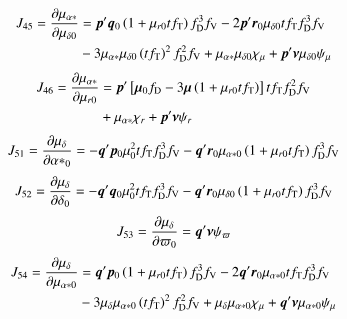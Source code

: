 \documentclass{aa}
\def\vec#1{\ensuremath{\mathchoice{\mbox{\boldmath$\displaystyle#1$}}
{\mbox{\boldmath$\textstyle#1$}}
{\mbox{\boldmath$\scriptstyle#1$}}
{\mbox{\boldmath$\scriptscriptstyle#1$}}}}
\begin{document}
\begin{equation*}
 \begin{aligned}
    J_{45}=\frac{\partial\mu_{\alpha*}}{\partial\mu_{\delta0}} &=
    \vec{p}'\vec{q}_0\left(1+\mu_{r0}tf_\mathrm{T}\right)f_\mathrm{D}^3f_\mathrm{V}
    -2\vec{p}'\vec{r}_0\mu_{\delta0}tf_\mathrm{T}f_\mathrm{D}^3f_\mathrm{V}\\
    &-3\mu_{\alpha*}\mu_{\delta0}\left(tf_\mathrm{T}\right)^2f_\mathrm{D}^2f_\mathrm{V}
    +\mu_{\alpha*}\mu_{\delta0}\chi_\mu
    +\vec{p}'\vec{\nu}\mu_{\delta0}\psi_\mu
 \end{aligned}
\end{equation*}
\begin{equation*}
 \begin{aligned}
    J_{46}=\frac{\partial\mu_{\alpha*}}{\partial\mu_{r0}}&=
    \vec{p}'\left[\vec{\mu}_0f_\mathrm{D}-3\vec{\mu}\left(1+\mu_{r0}tf_\mathrm{T}\right)\right]
    tf_\mathrm{T}f_\mathrm{D}^2f_\mathrm{V}\\
    &+\mu_{\alpha*}\chi_r+\vec{p}'\vec{\nu}\psi_r
 \end{aligned}
\end{equation*}
\begin{equation*}
 \begin{aligned}
    J_{51}=\frac{\partial\mu_\delta}{\partial{\alpha*}_0}=
    -\vec{q}'\vec{p}_0\mu_0^2tf_\mathrm{T}f_\mathrm{D}^3f_\mathrm{V}
    -\vec{q}'\vec{r}_0\mu_{\alpha*0}\left(1+\mu_{r0}tf_\mathrm{T}\right)f_\mathrm{D}^3f_\mathrm{V}
 \end{aligned}
\end{equation*}
\begin{equation*}
 \begin{aligned}
    J_{52}=\frac{\partial\mu_\delta}{\partial\delta_0}=
    -\vec{q}'\vec{q}_0\mu_0^2tf_\mathrm{T}f_\mathrm{D}^3f_\mathrm{V}
    -\vec{q}'\vec{r}_0\mu_{\delta0}\left(1+\mu_{r0}tf_\mathrm{T}\right)f_\mathrm{D}^3f_\mathrm{V}
 \end{aligned}
\end{equation*}
\begin{equation*}
 \begin{aligned}
    J_{53}=\frac{\partial\mu_\delta}{\partial\varpi_0}=
    \vec{q}'\vec{\nu}\psi_\varpi
 \end{aligned}
\end{equation*}
\begin{equation*}
 \begin{aligned}
    J_{54}=\frac{\partial\mu_\delta}{\partial\mu_{\alpha*0}} &=
    \vec{q}'\vec{p}_0\left(1+\mu_{r0}tf_\mathrm{T}\right)f_\mathrm{D}^3f_\mathrm{V}
    -2\vec{q}'\vec{r}_0\mu_{\alpha*0}tf_\mathrm{T}f_\mathrm{D}^3f_\mathrm{V}\\
    &-3\mu_\delta\mu_{\alpha*0}\left(tf_\mathrm{T}\right)^2f_\mathrm{D}^2f_\mathrm{V}
    +\mu_{\delta}\mu_{\alpha*0}\chi_\mu
    +\vec{q}'\vec{\nu}\mu_{\alpha*0}\psi_\mu
 \end{aligned}
\end{equation*}
\end{document}
